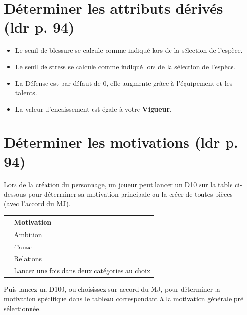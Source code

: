\documentclass[twoside]{article}
\begin{document}
\section{Déterminer les attributs dérivés (ldr p. 94)}

\begin{itemize}
	\item Le seuil de blessure se calcule comme indiqué lors de la sélection de l'espèce.
	\item Le seuil de stress se calcule comme indiqué lors de la sélection de l'espèce.
	\item La Défense est par défaut de 0, elle augmente grâce à l'équipement et les talents.
	\item La valeur d'encaissement est égale à votre \textbf{Vigueur}. 
\end{itemize}

\section{Déterminer les motivations (ldr p. 94)}
Lors de la création du personnage, un joueur peut lancer un D10 sur la table ci-dessous pour déterminer sa motivation principale ou la créer de toutes pièces (avec l'accord du MJ).

\begin{table}[h]
	\centering
	\begin{tabular}{|p{1cm}|p{7cm}|}
		\hline
		\centering{\cellcolor{DarkRed} {\large \textcolor{PureWhite}{\textbf{D10}}}} & \cellcolor{DarkRed} {\large \textcolor{PureWhite}{\textbf{Motivation}}} \\
		\hline
		\centering{1 -- 3} & Ambition \\
		\hline
		\centering{4 -- 6} & Cause \\
		\hline
		\centering{7 -- 9} & Relations \\
		\hline
		\centering{10} & Lancez une fois dans deux catégories au choix \\
		\hline	
	\end{tabular}
\end{table}

Puis lancez un D100, ou choisissez sur accord du MJ, pour déterminer la motivation spécifique dans le tableau correspondant à la motivation générale pré sélectionnée.
\end{document}
